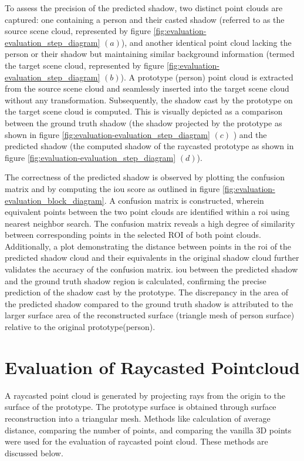To assess the precision of the predicted shadow, two distinct point clouds are captured: one containing a person and their casted shadow (referred to as the source scene cloud, represented by figure \ref{fig:evaluation-evaluation_step_diagram} \((a)\)), and another identical point cloud lacking the person or their shadow but maintaining similar background information (termed the target scene cloud, represented by figure \ref{fig:evaluation-evaluation_step_diagram} \((b)\)). A prototype (person) point cloud is extracted from the source scene cloud and seamlessly inserted into the target scene cloud without any transformation. Subsequently, the shadow cast by the prototype on the target scene cloud is computed. This is visually depicted as a comparison between the ground truth shadow (the shadow projected by the prototype as shown in figure \ref{fig:evaluation-evaluation_step_diagram} \((c)\) ) and the predicted shadow (the computed shadow of the raycasted prototype as shown in figure \ref{fig:evaluation-evaluation_step_diagram} \((d)\)).

The correctness of the predicted shadow is observed by plotting the confusion matrix and by computing the \acrshort{iou} score as outlined in figure \ref{fig:evaluation-evaluation_block_diagram}. A confusion matrix is constructed, wherein equivalent points between the two point clouds are identified within a \acrfull{roi} using nearest neighbor search. The confusion matrix reveals a high degree of similarity between corresponding points in the selected ROI of both point clouds. Additionally, a plot demonstrating the distance between points in the \acrshort{roi} of the predicted shadow cloud and their equivalents in the original shadow cloud further validates the accuracy of the confusion matrix. \acrfull{iou} between the predicted shadow and the ground truth shadow region is calculated, confirming the precise prediction of the shadow cast by the prototype. The discrepancy in the area of the predicted shadow compared to the ground truth shadow is attributed to the larger surface area of the reconstructed surface (triangle mesh of person surface) relative to the original prototype(person).

\section{Evaluation of Raycasted Pointcloud}

A raycasted point cloud is generated by projecting rays from the origin to the surface of the prototype. The prototype surface is obtained through surface reconstruction into a triangular mesh. Methods like calculation of average distance, comparing the number of points, and comparing the vanilla 3D points were used for the evaluation of raycasted point cloud. These methods are discussed below.
